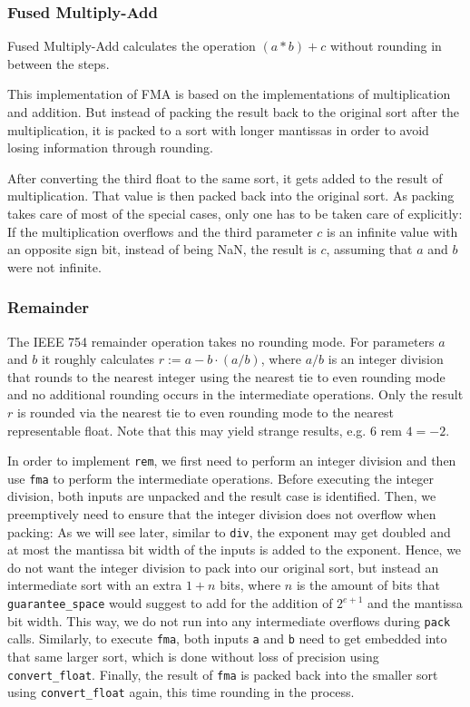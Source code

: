 \documentclass[a4paper,UKenglish,cleveref, autoref, thm-restate]{lipics-v2019}
\begin{document}
\subsubsection{Fused Multiply-Add}
Fused Multiply-Add calculates the operation $(a * b) + c$ without rounding in between the steps.

This implementation of FMA is based on the implementations of multiplication and addition. 
But instead of packing the result back to the original sort after the multiplication, it is packed to a sort with longer mantissas in order to avoid losing information through rounding. 

After converting the third float to the same sort, it gets added to the result of multiplication. That value is then packed back into the original sort. As packing takes care of most of the special cases, only one has to be taken care of explicitly:
If the multiplication overflows and the third parameter $c$ is an infinite value with an opposite sign bit, instead of being NaN, the result is $c$, assuming that $a$ and $b$ were not infinite.


\subsubsection{Remainder}
\label{rem}
The IEEE 754 remainder operation takes no rounding mode. For parameters $a$ and $b$ it roughly calculates $r := a - b \cdot (a / b)$, where $a / b$ is an integer division that rounds to the nearest integer using the nearest tie to even rounding mode and no additional rounding occurs in the intermediate operations. Only the result $r$ is rounded via the nearest tie to even rounding mode to the nearest representable float. Note that this may yield strange results, e.g. $6 \text{ rem } 4 = -2$.

In order to implement \verb|rem|, we first need to perform an integer division and then use \verb|fma| to perform the intermediate operations. Before executing the integer division, both inputs are unpacked and the result case is identified. Then, we preemptively need to ensure that the integer division does not overflow when packing: As we will see later, similar to \verb|div|, the exponent may get doubled and at most the mantissa bit width of the inputs is added to the exponent. Hence, we do not want the integer division to pack into our original sort, but instead an intermediate sort with an extra $1 + n$ bits, where $n$ is the amount of bits that \verb|guarantee_space| would suggest to add for the addition of $2^{e+1}$ and the mantissa bit width. This way, we do not run into any intermediate overflows during \verb|pack| calls. Similarly, to execute \verb|fma|, both inputs \verb|a| and \verb|b| need to get embedded into that same larger sort, which is done without loss of precision using \verb|convert_float|. Finally, the result of \verb|fma| is packed back into the smaller sort using \verb|convert_float| again, this time rounding in the process.
\end{document}
